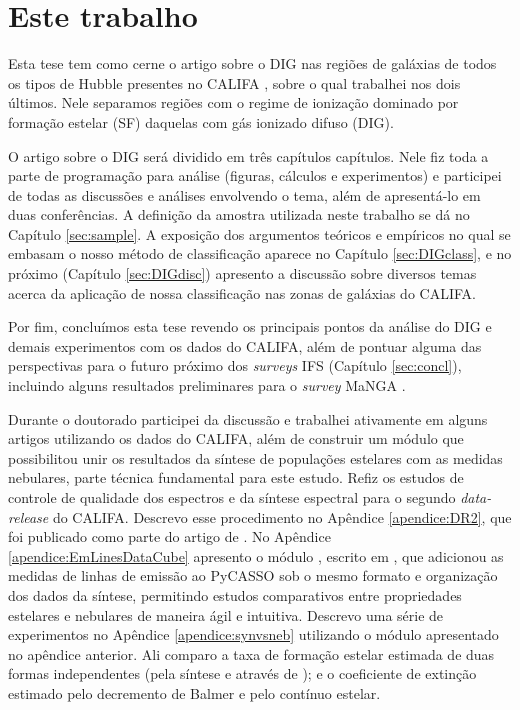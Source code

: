 \section{Este trabalho}
\label{sec:intro:estetrabalho}

Esta tese tem como cerne o artigo sobre o DIG nas regiões de galáxias de todos os tipos de Hubble presentes no CALIFA  \citep[][Apêndice \ref{apendice:DIGpaper0}]{Lacerda.etal.2018}, sobre o qual trabalhei nos dois últimos. Nele separamos regiões com o regime de ionização dominado por formação estelar (SF) daquelas com gás ionizado difuso (DIG).

O artigo sobre o DIG será dividido em três capítulos capítulos. Nele fiz toda a parte de programação para análise (figuras, cálculos e experimentos) e participei de todas as discussões e análises envolvendo o tema, além de apresentá-lo em duas conferências. A definição da amostra utilizada neste trabalho se dá no Capítulo \ref{sec:sample}. A exposição dos argumentos teóricos e empíricos no qual se embasam o nosso método de classificação aparece no Capítulo \ref{sec:DIGclass}, e no próximo (Capítulo \ref{sec:DIGdisc}) apresento a discussão sobre diversos temas acerca da aplicação de nossa classificação nas zonas de galáxias do CALIFA.

Por fim, concluímos esta tese revendo os principais pontos da análise do DIG e demais experimentos com os dados do CALIFA, além de pontuar alguma das perspectivas para o futuro próximo dos {\em surveys} IFS (Capítulo \ref{sec:concl}), incluindo alguns resultados preliminares para o {\em survey} MaNGA \citep{Bundy.etal.2015}.

Durante o doutorado participei da discussão e trabalhei ativamente em alguns artigos utilizando os dados do CALIFA, além de construir um módulo que possibilitou unir os resultados da síntese de populações estelares com as medidas nebulares, parte técnica fundamental para este estudo. Refiz os estudos de controle de qualidade dos espectros e da síntese espectral para o segundo {\em data-release} do CALIFA. Descrevo esse procedimento no Apêndice \ref{apendice:DR2}, que foi publicado como parte do artigo de \citet[][Apêndice \ref{apendice:GBetal2015a}]{GarciaBenito.etal.2015a}. No Apêndice \ref{apendice:EmLinesDataCube} apresento o módulo \emldc, escrito em \pyt, que adicionou as medidas de linhas de emissão ao PyCASSO sob o mesmo formato e organização dos dados da síntese, permitindo estudos comparativos entre propriedades estelares e nebulares de maneira ágil e intuitiva. Descrevo uma série de experimentos no Apêndice \ref{apendice:synvsneb} utilizando o módulo apresentado no apêndice anterior. Ali comparo a taxa de formação estelar estimada de duas formas independentes (pela síntese e através de \Ha); e o coeficiente de extinção estimado pelo decremento de Balmer e pelo contínuo estelar.

